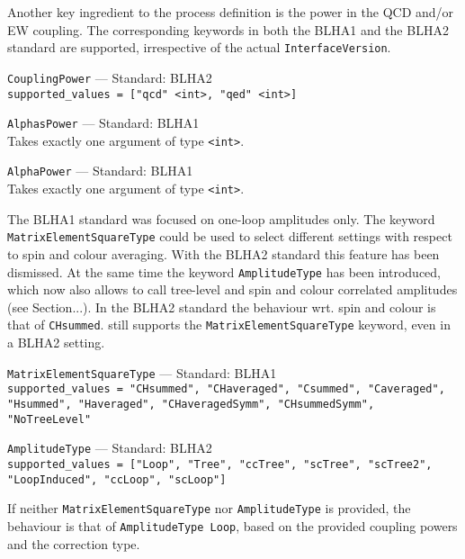 Another key ingredient to the process definition is the power in the QCD and/or EW coupling. The corresponding keywords in both the BLHA1 and the BLHA2 standard are supported, irrespective of the actual \texttt{InterfaceVersion}.
\begin{basedescript}{\desclabelstyle{\pushlabel}}
    \item[\hspace{-1em}]\colorbox{gray!30}{\lstinline[style=in]|CouplingPower|} --- Standard: BLHA2\vspace{0.1cm}\\
        \lstinline[style=in]|supported_values = ["qcd" <int>, "qed" <int>]|
     \item[\hspace{-1em}]\colorbox{gray!30}{\lstinline[style=in]|AlphasPower|} --- Standard: BLHA1\vspace{0.1cm}\\
        Takes exactly one argument of type \texttt{<int>}.
    \item[\hspace{-1em}]\colorbox{gray!30}{\lstinline[style=in]|AlphaPower|} --- Standard: BLHA1\vspace{0.1cm}\\
        Takes exactly one argument of type \texttt{<int>}.
\end{basedescript}

The BLHA1 standard was focused on one-loop amplitudes only. The keyword \texttt{MatrixElementSquareType} could be used to select different settings with respect to spin and colour averaging. With the BLHA2 standard this feature has been dismissed. At the same time the keyword \texttt{AmplitudeType} has been introduced, which now also allows to call tree-level and spin and colour correlated amplitudes (see Section...). In the BLHA2 standard the behaviour wrt. spin and colour is that of \texttt{CHsummed}. \gosam still supports the \texttt{MatrixElementSquareType} keyword, even in a BLHA2 setting.
\begin{basedescript}{\desclabelstyle{\pushlabel}}
    \item[\hspace{-1em}]\colorbox{gray!30}{\lstinline[style=in]|MatrixElementSquareType|} --- Standard: BLHA1\vspace{0.1cm}\\
        \lstinline[style=in]|supported_values = "CHsummed", "CHaveraged", "Csummed", "Caveraged", "Hsummed", "Haveraged", "CHaveragedSymm", "CHsummedSymm", "NoTreeLevel"|
    \item[\hspace{-1em}]\colorbox{gray!30}{\lstinline[style=in]|AmplitudeType|} --- Standard: BLHA2\vspace{0.1cm}\\
        \lstinline[style=in]|supported_values = ["Loop", "Tree", "ccTree", "scTree", "scTree2", "LoopInduced", "ccLoop", "scLoop"]|\\
\end{basedescript}
If neither \texttt{MatrixElementSquareType} nor \texttt{AmplitudeType} is provided, the behaviour is that of \lstinline[style=in]|AmplitudeType Loop|, based on the provided coupling powers and the correction type.

